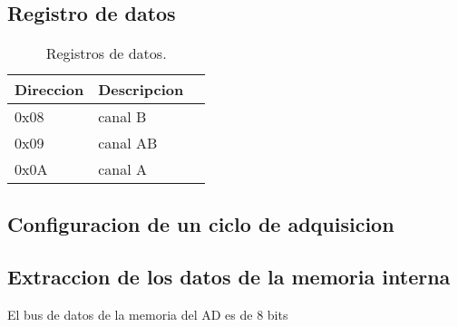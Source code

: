 \subsection{Registro de datos}

\begin{table}[ht]
    \centering
    \begin{tabular}{|l|l|l|}
    \hline
    Direccion & Descripcion \\
    \hline
     0x08 & canal B\\ 
    \hline
     0x09 & canal AB\\
     \hline
     0x0A & canal A\\
\end{tabular}
\caption{\label{tab:registros_ad_datos}Registros de datos.}
\end{table}


\subsection{Configuracion de un ciclo de adquisicion}








\subsection{Extraccion de los datos de la memoria interna}

El bus de datos de la memoria del AD es de 8 bits 


\newpage
